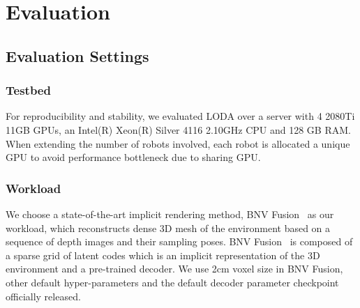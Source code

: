 \section{Evaluation}
\subsection{Evaluation Settings}

\subsubsection{Testbed}
For reproducibility and stability, we evaluated LODA over a server with 4 2080Ti 11GB GPUs, an Intel(R) Xeon(R) Silver 4116 2.10GHz CPU and 128 GB RAM.
When extending the number of robots involved, each robot is allocated a unique GPU to avoid performance bottleneck due to sharing GPU.


\subsubsection{Workload}
We choose a state-of-the-art implicit rendering method, BNV Fusion~\cite{li2022bnvfusion} as our workload, which reconstructs dense 3D mesh of the environment based on a sequence of depth images and their sampling poses.
BNV Fusion~\cite{li2022bnvfusion} is composed of a sparse grid of latent codes which is an implicit representation of the 3D environment and a pre-trained decoder.
We use 2cm voxel size in BNV Fusion, other default hyper-parameters and the default decoder parameter checkpoint officially released.




